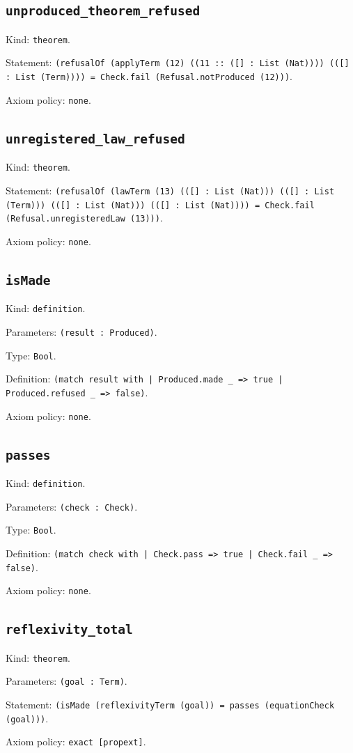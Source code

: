 \documentclass[11pt]{article}
\begin{document}
\subsection*{\texttt{unproduced\_theorem\_refused}}
\noindent Kind: \texttt{theorem}.\par
\noindent Statement: \texttt{(refusalOf (applyTerm (12) ((11 :: ([] : List (Nat)))) (([] : List (Term)))) = Check.fail (Refusal.notProduced (12)))}.\par
\noindent Axiom policy: \texttt{none}.\par
\subsection*{\texttt{unregistered\_law\_refused}}
\noindent Kind: \texttt{theorem}.\par
\noindent Statement: \texttt{(refusalOf (lawTerm (13) (([] : List (Nat))) (([] : List (Term))) (([] : List (Nat))) (([] : List (Nat)))) = Check.fail (Refusal.unregisteredLaw (13)))}.\par
\noindent Axiom policy: \texttt{none}.\par
\subsection*{\texttt{isMade}}
\noindent Kind: \texttt{definition}.\par
\noindent Parameters: \texttt{(result : Produced)}.\par
\noindent Type: \texttt{Bool}.\par
\noindent Definition: \texttt{(match result with | Produced.made \_ => true | Produced.refused \_ => false)}.\par
\noindent Axiom policy: \texttt{none}.\par
\subsection*{\texttt{passes}}
\noindent Kind: \texttt{definition}.\par
\noindent Parameters: \texttt{(check : Check)}.\par
\noindent Type: \texttt{Bool}.\par
\noindent Definition: \texttt{(match check with | Check.pass => true | Check.fail \_ => false)}.\par
\noindent Axiom policy: \texttt{none}.\par
\subsection*{\texttt{reflexivity\_total}}
\noindent Kind: \texttt{theorem}.\par
\noindent Parameters: \texttt{(goal : Term)}.\par
\noindent Statement: \texttt{(isMade (reflexivityTerm (goal)) = passes (equationCheck (goal)))}.\par
\noindent Axiom policy: \texttt{exact [propext]}.\par
\end{document}
